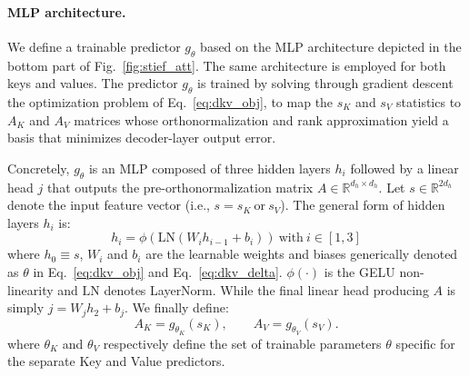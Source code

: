 \paragraph{MLP architecture.}
We define a trainable predictor $g_\theta$ based on the MLP architecture depicted in the bottom part of Fig.~\ref{fig:stief_att}. The same architecture is employed for both keys and values. The predictor $g_\theta$ is trained by solving through gradient descent the optimization problem of Eq.~\ref{eq:dkv_obj}, to map the $s_K$ and $s_V$ statistics to $A_K$ and $A_V$ matrices whose orthonormalization and rank approximation yield a basis that minimizes decoder-layer output error.
%

Concretely, $g_\theta$ is an MLP composed of three hidden layers $h_i$ followed by a linear head $j$ that outputs the pre-orthonormalization matrix $A \in \mathbb{R}^{d_h\times d_h}$.
Let $s\in\mathbb{R}^{2d_h}$ denote the input feature vector (i.e., $s=s_K \: \text{or} \: s_V$).
The general form of hidden layers $h_i$ is:
\begin{equation}
h_i = \phi \left( \mathrm{LN}\left(W_i h_{i-1} + b_i\right) \right) \ \text{with} \ i \in \left[1, 3\right]
\label{eq:dkv_mlp}
\end{equation}
where $h_0 \equiv s$, $W_i$ and $b_i$ are the learnable weights and biases generically denoted as $\theta$ in Eq.~\ref{eq:dkv_obj} and Eq.~\ref{eq:dkv_delta}. $\phi(\cdot)$ is the GELU non-linearity and $\mathrm{LN}$ denotes LayerNorm.
While the final linear head producing $A$ is simply $j = W_j h_2 + b_j$.
%
We finally define:
\begin{equation}
A_K = g_{\theta_K}(s_K),\qquad A_V = g_{\theta_V}(s_V).
\label{eq:dkv_raw}
\end{equation}
where $\theta_K$ and $\theta_V$ respectively define the set of trainable parameters $\theta$ specific for the separate Key and Value predictors.

